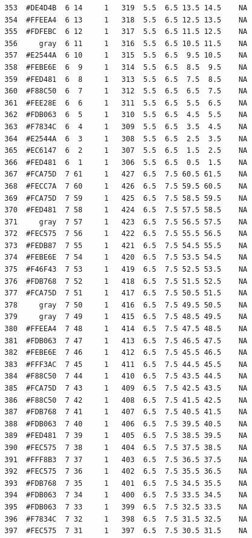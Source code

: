 \documentclass[12pt,twoside]{reedthesis}
\begin{document}
\begin{verbatim}
  353  #DE4D4B  6 14     1   319  5.5  6.5 13.5 14.5    NA
  354  #FFEEA4  6 13     1   318  5.5  6.5 12.5 13.5    NA
  355  #FDFEBC  6 12     1   317  5.5  6.5 11.5 12.5    NA
  356     gray  6 11     1   316  5.5  6.5 10.5 11.5    NA
  357  #E2544A  6 10     1   315  5.5  6.5  9.5 10.5    NA
  358  #FEBE6E  6  9     1   314  5.5  6.5  8.5  9.5    NA
  359  #FED481  6  8     1   313  5.5  6.5  7.5  8.5    NA
  360  #F88C50  6  7     1   312  5.5  6.5  6.5  7.5    NA
  361  #FEE28E  6  6     1   311  5.5  6.5  5.5  6.5    NA
  362  #FDB063  6  5     1   310  5.5  6.5  4.5  5.5    NA
  363  #F7834C  6  4     1   309  5.5  6.5  3.5  4.5    NA
  364  #E2544A  6  3     1   308  5.5  6.5  2.5  3.5    NA
  365  #EC6147  6  2     1   307  5.5  6.5  1.5  2.5    NA
  366  #FED481  6  1     1   306  5.5  6.5  0.5  1.5    NA
  367  #FCA75D  7 61     1   427  6.5  7.5 60.5 61.5    NA
  368  #FECC7A  7 60     1   426  6.5  7.5 59.5 60.5    NA
  369  #FCA75D  7 59     1   425  6.5  7.5 58.5 59.5    NA
  370  #FED481  7 58     1   424  6.5  7.5 57.5 58.5    NA
  371     gray  7 57     1   423  6.5  7.5 56.5 57.5    NA
  372  #FEC575  7 56     1   422  6.5  7.5 55.5 56.5    NA
  373  #FEDB87  7 55     1   421  6.5  7.5 54.5 55.5    NA
  374  #FEBE6E  7 54     1   420  6.5  7.5 53.5 54.5    NA
  375  #F46F43  7 53     1   419  6.5  7.5 52.5 53.5    NA
  376  #FDB768  7 52     1   418  6.5  7.5 51.5 52.5    NA
  377  #FCA75D  7 51     1   417  6.5  7.5 50.5 51.5    NA
  378     gray  7 50     1   416  6.5  7.5 49.5 50.5    NA
  379     gray  7 49     1   415  6.5  7.5 48.5 49.5    NA
  380  #FFEEA4  7 48     1   414  6.5  7.5 47.5 48.5    NA
  381  #FDB063  7 47     1   413  6.5  7.5 46.5 47.5    NA
  382  #FEBE6E  7 46     1   412  6.5  7.5 45.5 46.5    NA
  383  #FFF3AC  7 45     1   411  6.5  7.5 44.5 45.5    NA
  384  #F88C50  7 44     1   410  6.5  7.5 43.5 44.5    NA
  385  #FCA75D  7 43     1   409  6.5  7.5 42.5 43.5    NA
  386  #F88C50  7 42     1   408  6.5  7.5 41.5 42.5    NA
  387  #FDB768  7 41     1   407  6.5  7.5 40.5 41.5    NA
  388  #FDB063  7 40     1   406  6.5  7.5 39.5 40.5    NA
  389  #FED481  7 39     1   405  6.5  7.5 38.5 39.5    NA
  390  #FEC575  7 38     1   404  6.5  7.5 37.5 38.5    NA
  391  #FFF8B3  7 37     1   403  6.5  7.5 36.5 37.5    NA
  392  #FEC575  7 36     1   402  6.5  7.5 35.5 36.5    NA
  393  #FDB768  7 35     1   401  6.5  7.5 34.5 35.5    NA
  394  #FDB063  7 34     1   400  6.5  7.5 33.5 34.5    NA
  395  #FDB063  7 33     1   399  6.5  7.5 32.5 33.5    NA
  396  #F7834C  7 32     1   398  6.5  7.5 31.5 32.5    NA
  397  #FEC575  7 31     1   397  6.5  7.5 30.5 31.5    NA

\end{verbatim}
\end{document}
